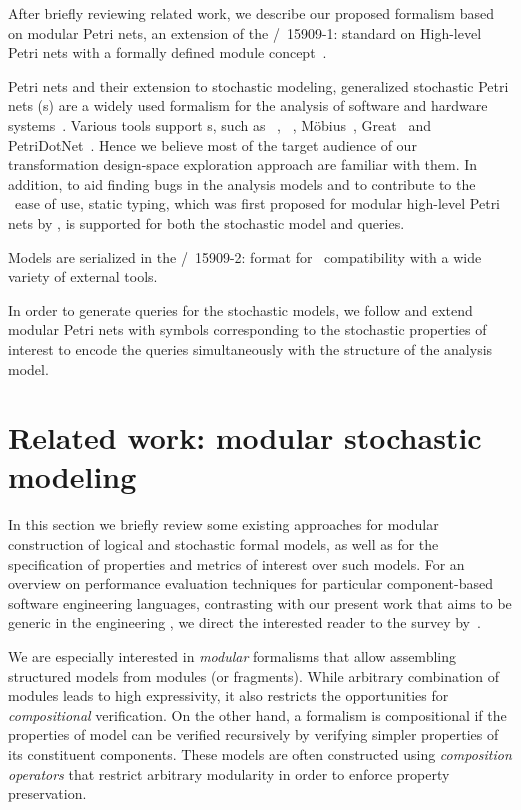 After briefly reviewing related work, we describe our proposed formalism based on modular Petri nets, an extension of the /~15909-1:\citeyear{ISO1590912004} standard on High-level Petri nets with a formally defined module concept~\citep{Kindler09modular}.

Petri nets and their extension to stochastic modeling, generalized stochastic Petri nets (s) are a widely used formalism for the analysis of software and hardware systems~\citep{Murata89petri}. Various tools support s, such as ~\citep{Hirel00spnp}, ~\citep{Ciardo06smart}, M\"obius~\citep{Courtney09mobius}, Great~\citep{Babar10greatspn} and Petri\-Dot\-Net~\citep{Voros17pdn}. Hence we believe most of the target audience of our transformation design-space exploration approach are familiar with them. In addition, to aid finding bugs in the analysis models and to contribute to the ~ease of use, static typing, which was first proposed for modular high-level Petri nets by \citet{Kindler07modular}, is supported for both the stochastic model and queries.

Models are serialized in the /~15909-2:\citeyear{ISO1590922011}  format for ~compatibility with a wide variety of external tools.

In order to  generate queries for the stochastic models, we follow \citet{Kindler01modular} and extend modular Petri nets with symbols corresponding to the stochastic properties of interest to encode the queries simultaneously with the structure of the analysis model.

\section{Related work: modular stochastic modeling}

In this section we briefly review some existing approaches for modular construction of logical and stochastic formal models, as well as for the specification of properties and metrics of interest over such models. For an overview on performance evaluation techniques for particular component-based software engineering languages, contrasting with our present work that aims to be generic in the engineering , we direct the interested reader to the survey by~\citet{Koziolek10review}.

We are especially interested in \emph{modular} formalisms that allow assembling structured models from modules (or fragments). While arbitrary combination of modules leads to high expressivity, it also restricts the opportunities for \emph{compositional} verification. On the other hand, a formalism is compositional if the properties of model can be verified recursively by verifying simpler properties of its constituent components. These models are often constructed using \emph{composition operators} that restrict arbitrary modularity in order to enforce property preservation. 

